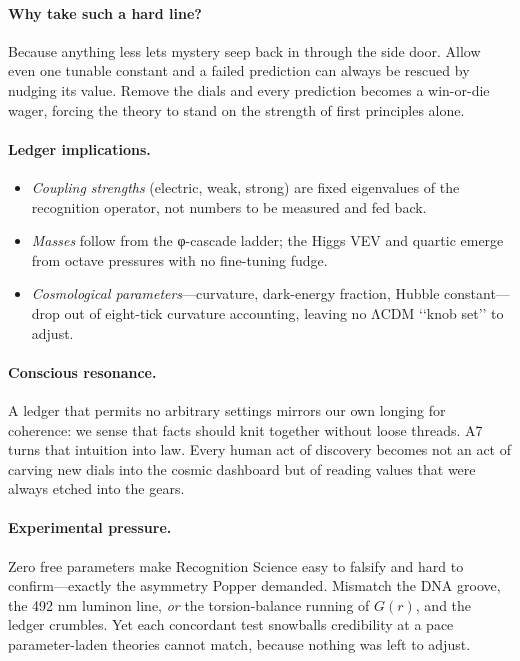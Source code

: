 \documentclass[11pt,oneside]{book}
\begin{document}
\paragraph*{Why take such a hard line?}
Because anything less lets mystery seep back in through the side door.  
Allow even one tunable constant and a failed prediction can always be
rescued by nudging its value.  
Remove the dials and every prediction becomes a win-or-die wager,
forcing the theory to stand on the strength of first principles alone.

\paragraph*{Ledger implications.}
\begin{itemize}
\item \emph{Coupling strengths} (electric, weak, strong) are fixed
      eigenvalues of the recognition operator, not numbers to be
      measured and fed back.  
\item \emph{Masses} follow from the φ-cascade ladder; the Higgs VEV and
      quartic emerge from octave pressures with no fine-tuning fudge.  
\item \emph{Cosmological parameters}—curvature, dark-energy fraction,
      Hubble constant—drop out of eight-tick curvature accounting,
      leaving no ΛCDM ‘‘knob set’’ to adjust.
\end{itemize}

\paragraph*{Conscious resonance.}
A ledger that permits no arbitrary settings mirrors our own longing for
coherence: we sense that facts should knit together without loose
threads.  
A7 turns that intuition into law.  
Every human act of discovery becomes not an act of carving new dials
into the cosmic dashboard but of reading values that were always etched
into the gears.

\paragraph*{Experimental pressure.}
Zero free parameters make Recognition Science easy to falsify and hard
to confirm—exactly the asymmetry Popper demanded.  
Mismatch the DNA groove, the 492 nm luminon line, \emph{or} the
torsion-balance running of \(G(r)\), and the ledger crumbles.  
Yet each concordant test snowballs credibility at a pace
parameter-laden theories cannot match, because nothing was left to
adjust.
\end{document}
